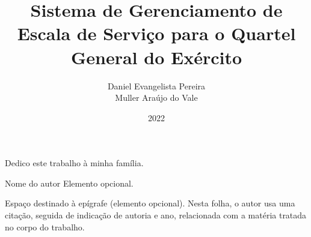 \documentclass[tsi]{ifbclass/ifbclass}
\title{Sistema de Gerenciamento de Escala de Serviço para o Quartel General do Exército }
\date{2022}
\author{Daniel Evangelista Pereira\\Muller Araújo do Vale}
\begin{document}
\frontmatter

\frontpage

\presentationpage

\begin{fichacatalografica}
  \FakeFichaCatalografica
\end{fichacatalografica}

\banca

\begin{dedicatory} %
Dedico este trabalho à minha família.
\end{dedicatory}
  
\acknowledgements %


\begin{epigraph}[]{Nome do autor} %
Elemento opcional.

Espaço destinado à epígrafe (elemento opcional). Nesta folha, o autor usa uma citação, seguida de indicação de autoria e ano, relacionada com a matéria tratada no corpo do trabalho.
\end{epigraph}

\resumo
{\parindent0pt
  
}
  
\abstract
{\parindent0pt
  
}

\listoffigures

\lstlistoflistings

\listoftables

\listofacronyms


\tableofcontents

\mainmatter

 






\begin{references}
  
\end{references}


\theappendix

\end{document}
